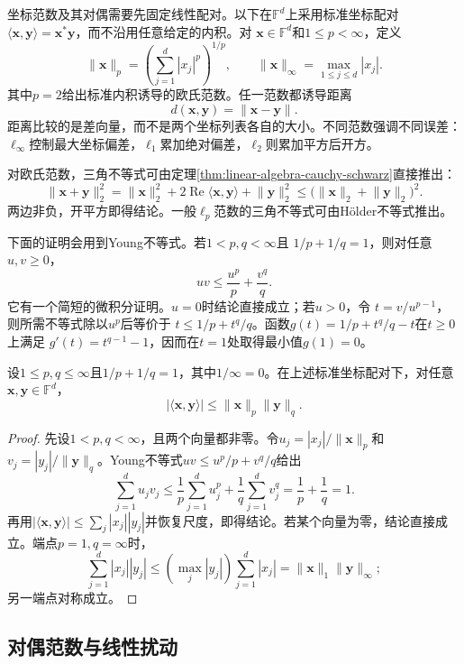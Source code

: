 坐标范数及其对偶需要先固定线性配对。以下在$\mathbb{F}^d$上采用标准坐标配对
$\langle\bm{x},\bm{y}\rangle=\bm{x}^{*}\bm{y}$，而不沿用任意给定的内积。对
$\bm{x}\in\mathbb{F}^d$和$1\leq p<\infty$，定义
\[
  \lVert\bm{x}\rVert_p
  =
  \left(\sum_{j=1}^{d}|x_j|^p\right)^{1/p},
  \qquad
  \lVert\bm{x}\rVert_{\infty}
  =
  \max_{1\leq j\leq d}|x_j|.
\]
其中$p=2$给出标准内积诱导的欧氏范数。任一范数都诱导距离
\[
  d(\bm{x},\bm{y})=\lVert\bm{x}-\bm{y}\rVert.
\]
距离比较的是差向量，而不是两个坐标列表各自的大小。不同范数强调不同误差：$\ell_{\infty}$控制最大坐标偏差，$\ell_1$累加绝对偏差，$\ell_2$则累加平方后开方。

对欧氏范数，三角不等式可由定理\ref{thm:linear-algebra-cauchy-schwarz}直接推出：
\[
  \lVert\bm{x}+\bm{y}\rVert_2^2
  =
  \lVert\bm{x}\rVert_2^2
  +2\operatorname{Re}\langle\bm{x},\bm{y}\rangle
  +\lVert\bm{y}\rVert_2^2
  \leq
  \bigl(\lVert\bm{x}\rVert_2+\lVert\bm{y}\rVert_2\bigr)^2.
\]
两边非负，开平方即得结论。一般$\ell_p$范数的三角不等式可由Hölder不等式推出。

下面的证明会用到Young不等式。若$1<p,q<\infty$且
$1/p+1/q=1$，则对任意$u,v\geq0$，
\[
  uv\leq\frac{u^p}{p}+\frac{v^q}{q}.
\]
它有一个简短的微积分证明。$u=0$时结论直接成立；若$u>0$，令
$t=v/u^{p-1}$，则所需不等式除以$u^p$后等价于
$t\leq1/p+t^q/q$。函数$g(t)=1/p+t^q/q-t$在$t\geq0$上满足
$g'(t)=t^{q-1}-1$，因而在$t=1$处取得最小值$g(1)=0$。

\begin{theorem}[有限维Hölder不等式]
\label{thm:linear-algebra-holder}
设$1\leq p,q\leq\infty$且$1/p+1/q=1$，其中$1/\infty=0$。在上述标准坐标配对下，对任意$\bm{x},\bm{y}\in\mathbb{F}^d$，
\[
  |\langle\bm{x},\bm{y}\rangle|
  \leq
  \lVert\bm{x}\rVert_p\lVert\bm{y}\rVert_q.
\]
\end{theorem}

\begin{proof}
先设$1<p,q<\infty$，且两个向量都非零。令$u_j=|x_j|/\lVert\bm{x}\rVert_p$和$v_j=|y_j|/\lVert\bm{y}\rVert_q$。Young不等式$uv\leq u^p/p+v^q/q$给出
\[
  \sum_{j=1}^{d}u_jv_j
  \leq
  \frac{1}{p}\sum_{j=1}^{d}u_j^p
  +
  \frac{1}{q}\sum_{j=1}^{d}v_j^q
  =
  \frac{1}{p}+\frac{1}{q}
  =1.
\]
再用$|\langle\bm{x},\bm{y}\rangle| \leq\sum_j|x_j||y_j|$并恢复尺度，即得结论。若某个向量为零，结论直接成立。端点$p=1,q=\infty$时，
\[
  \sum_{j=1}^{d}|x_j||y_j|
  \leq
  \left(\max_j|y_j|\right)\sum_{j=1}^{d}|x_j|
  =
  \lVert\bm{x}\rVert_1\lVert\bm{y}\rVert_{\infty};
\]
另一端点对称成立。
\end{proof}

\subsection{对偶范数与线性扰动}

